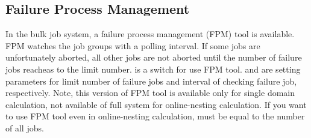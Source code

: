 \subsection{Failure Process Management}
In the \scalerm bulk job system, a failure process management (FPM) tool is available. FPM watches the job groups with a polling interval.
If some jobs are unfortunately aborted, all other jobs are not aborted until the number of failure jobs reacheas to the limit number.
 is a switch for use FPM tool.
 and  are setting parameters for limit number of failure jobs and interval of checking failure job, respectively.
Note, this version of FPM tool is available only for single domain calculation, not available of full system for online-nesting calculation. If you want to use FPM tool even in online-nesting calculation,
 must be equal to the number of all jobs.


